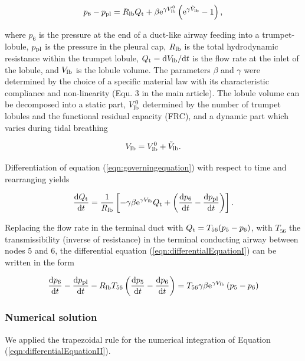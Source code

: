 \begin{equation} \label{eqn:governingequation}
p_6 - p_{\mathrm{pl}} = R_{\mathrm{lb}} Q_{\mathrm{t}} + \beta\mathrm{e}^{\gamma V_{\mathrm{lb}}^0}\left(\mathrm{e}^{\gamma \tilde{V}_{\mathrm{lb}}} - 1 \right) \text{,}
\end{equation}

where $p_6$ is the pressure at the end of a duct-like airway feeding into a trumpet-lobule, $p_{\mathrm{pl}}$ is the pressure in the pleural cap, $R_{\mathrm{lb}}$ is the total hydrodynamic resistance within the trumpet lobule, $Q_{\mathrm{t}} = \mathrm{d} V_{\mathrm{lb}} / \mathrm{d} t$ is the flow rate at the inlet of the lobule, and $V_{\mathrm{lb}}$ is the lobule volume.
The parameters $\beta$ and $\gamma$ were determined by the choice of a specific material law with its characteristic compliance and non-linearity (Equ. 3 in the main article).
The lobule volume can be decomposed into a static part, $V_{\mathrm{lb}}^0$ determined by the number of trumpet lobules and the functional residual capacity (FRC), and a dynamic part which varies during tidal breathing

\begin{equation}
V_{\mathrm{lb}} = V_{\mathrm{lb}}^0 + \tilde{V}_{\mathrm{lb}} \text{.}
\end{equation}

Differentiation of equation (\ref{eqn:governingequation}) with respect to time and rearranging yields

\begin{equation} \label{eqn:differentialEquationI}
\frac{\mathrm{d} Q_{\mathrm{t}}}{\mathrm{d} t} = \frac{1}{R_{\mathrm{lb}}}\left[ -\gamma\beta\mathrm{e}^{\gamma V_{\mathrm{lb}}}Q_{\mathrm{t}} + \left(\frac{\mathrm{d} p_6}{\mathrm{d} t} - \frac{\mathrm{d} p_{\mathrm{pl}}}{\mathrm{d} t}\right)\right] \text{.}
\end{equation}

Replacing the flow rate in the terminal duct with $Q_{\mathrm{t}} = T_{56}(p_5 - p_6)$, with $T_{56}$ the transmissibility (inverse of resistance) in the terminal conducting airway between nodes $5$ and $6$, the differential equation (\ref{eqn:differentialEquationI}) can be written in the form

\begin{equation} \label{eqn:differentialEquationII}
  \frac{\mathrm{d} p_6}{\mathrm{d} t} - \frac{\mathrm{d} p_{\mathrm{pl}}}{\mathrm{d} t} - R_{\mathrm{lb}} T_{56}\left(\frac{\mathrm{d} p_5}{\mathrm{d} t} - \frac{\mathrm{d} p_6}{\mathrm{d} t}\right) = T_{56}\gamma\beta\mathrm{e}^{\gamma V_{\mathrm{lb}}}\left( p_5 - p_6\right)
\end{equation}


\subsubsection{Numerical solution}
We applied the trapezoidal rule for the numerical integration of Equation (\ref{eqn:differentialEquationII}).

